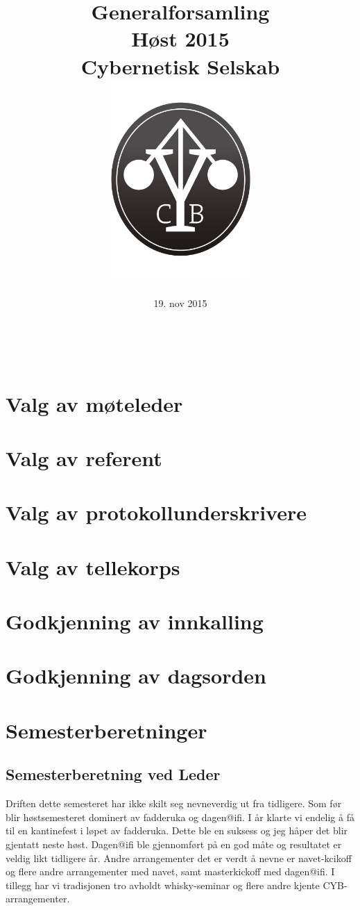 \documentclass[16pt,norsk,a4paper]{article}
\title{Generalforsamling\\
	Høst 2015\\
	Cybernetisk Selskab\\[.3cm]
	\includegraphics[width=0.4\textwidth]{cyblogoa3.pdf}\\[-.8cm]}
\date{19. nov 2015}
\begin{document}
\maketitle{}
\newpage
\tableofcontents{}

~\\

\section{Valg av møteleder}

\section{Valg av referent}

\section{Valg av protokollunderskrivere}

\section{Valg av tellekorps}

\section{Godkjenning av innkalling}

\section{Godkjenning av dagsorden}

\newpage


\section{Semesterberetninger}
\subsection{Semesterberetning ved Leder}
Driften dette semesteret har ikke skilt seg nevneverdig ut fra tidligere. Som før blir høstsemesteret dominert av fadderuka og dagen@ifi. I år klarte vi endelig å få til en kantinefest i løpet av fadderuka. Dette ble en suksess og jeg håper det blir gjentatt neste høst. Dagen@ifi ble gjennomført på en god måte og resultatet er veldig likt tidligere år. Andre arrangementer det er verdt å nevne er navet-kcikoff og flere andre arrangementer med navet, samt masterkickoff med dagen@ifi. I tillegg har vi tradisjonen tro avholdt whisky-seminar og flere andre kjente CYB-arrangementer.\\
\end{document}
